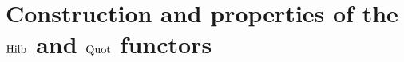 \section{Construction and properties of the \texorpdfstring{$\mathrm{Hilb}$}{} and \texorpdfstring{$\mathrm{Quot}$}{} functors}